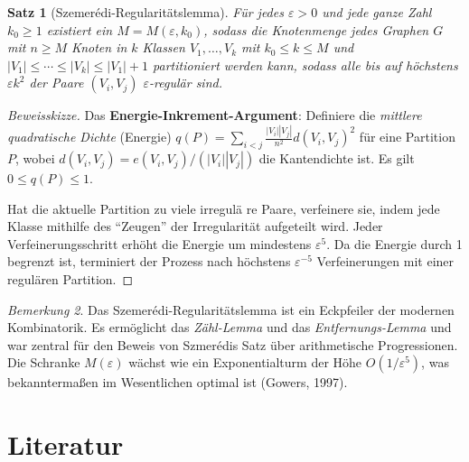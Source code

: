 \documentclass[12pt,a4paper]{amsart}
\newtheorem{theorem}{Satz}[section]
\theoremstyle{definition}
\theoremstyle{remark}
\newtheorem{remark}[theorem]{Bemerkung}
\begin{document}
\begin{theorem}[Szemerédi-Regularitätslemma]
\label{satz:szemeredi}
Für jedes $\varepsilon > 0$ und jede ganze Zahl $k_0 \ge 1$ existiert ein
$M = M(\varepsilon, k_0)$, sodass die Knotenmenge jedes Graphen $G$ mit
$n \ge M$ Knoten in $k$ Klassen $V_1, \ldots, V_k$ mit $k_0 \le k \le M$
und $|V_1| \le \cdots \le |V_k| \le |V_1| + 1$ partitioniert werden kann,
sodass alle bis auf höchstens $\varepsilon k^2$ der Paare $(V_i, V_j)$
$\varepsilon$-regulär sind.
\end{theorem}

\begin{proof}[Beweisskizze]
Das \textbf{Energie-Inkrement-Argument}: Definiere die \emph{mittlere quadratische
Dichte} (Energie) $q(P) = \sum_{i<j} \frac{|V_i||V_j|}{n^2} d(V_i, V_j)^2$
für eine Partition $P$, wobei $d(V_i, V_j) = e(V_i, V_j)/(|V_i||V_j|)$ die
Kantendichte ist. Es gilt $0 \le q(P) \le 1$.

Hat die aktuelle Partition zu viele irregulä re Paare, verfeinere sie, indem
jede Klasse mithilfe des ``Zeugen'' der Irregularität aufgeteilt wird. Jeder
Verfeinerungsschritt erhöht die Energie um mindestens $\varepsilon^5$. Da
die Energie durch 1 begrenzt ist, terminiert der Prozess nach höchstens
$\varepsilon^{-5}$ Verfeinerungen mit einer regulären Partition.
\end{proof}

\begin{remark}
Das Szemerédi-Regularitätslemma ist ein Eckpfeiler der modernen Kombinatorik.
Es ermöglicht das \emph{Zähl-Lemma} und das \emph{Entfernungs-Lemma} und
war zentral für den Beweis von Szmerédis Satz über arithmetische Progressionen.
Die Schranke $M(\varepsilon)$ wächst wie ein Exponentialturm der Höhe
$O(1/\varepsilon^5)$, was bekanntermaßen im Wesentlichen optimal ist
(Gowers, 1997).
\end{remark}

\section{Literatur}
\label{sec:literatur}
\end{document}
